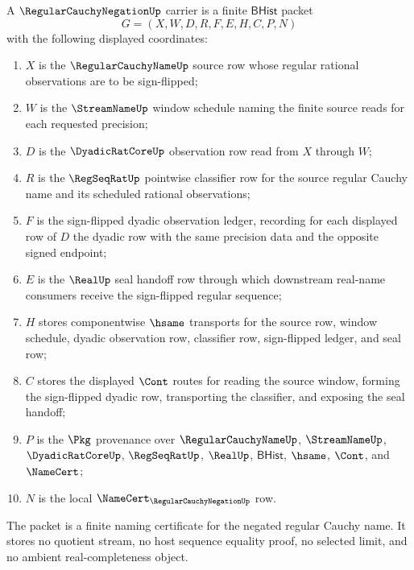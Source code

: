 \begin{definition}
\label{def:regular-cauchy-negation-carrier}
A $\RegularCauchyNegationUp$ carrier is a finite $\mathsf{BHist}$ packet
$$
G=(X,W,D,R,F,E,H,C,P,N)
$$
with the following displayed coordinates:
\begin{enumerate}
\item $X$ is the $\RegularCauchyNameUp$ source row whose regular rational observations are to be sign-flipped;
\item $W$ is the $\StreamNameUp$ window schedule naming the finite source reads for each requested precision;
\item $D$ is the $\DyadicRatCoreUp$ observation row read from $X$ through $W$;
\item $R$ is the $\RegSeqRatUp$ pointwise classifier row for the source regular Cauchy name and its scheduled rational observations;
\item $F$ is the sign-flipped dyadic observation ledger, recording for each displayed row of $D$ the dyadic row with the same precision data and the opposite signed endpoint;
\item $E$ is the $\RealUp$ seal handoff row through which downstream real-name consumers receive the sign-flipped regular sequence;
\item $H$ stores componentwise $\hsame$ transports for the source row, window schedule, dyadic observation row, classifier row, sign-flipped ledger, and seal row;
\item $C$ stores the displayed $\Cont$ routes for reading the source window, forming the sign-flipped dyadic row, transporting the classifier, and exposing the seal handoff;
\item $P$ is the $\Pkg$ provenance over $\RegularCauchyNameUp$, $\StreamNameUp$, $\DyadicRatCoreUp$, $\RegSeqRatUp$, $\RealUp$, $\mathsf{BHist}$, $\hsame$, $\Cont$, and $\NameCert$;
\item $N$ is the local $\NameCert_{\RegularCauchyNegationUp}$ row.
\end{enumerate}
The packet is a finite naming certificate for the negated regular Cauchy name. It stores no quotient stream, no host sequence equality proof, no selected limit, and no ambient real-completeness object.
\end{definition}

